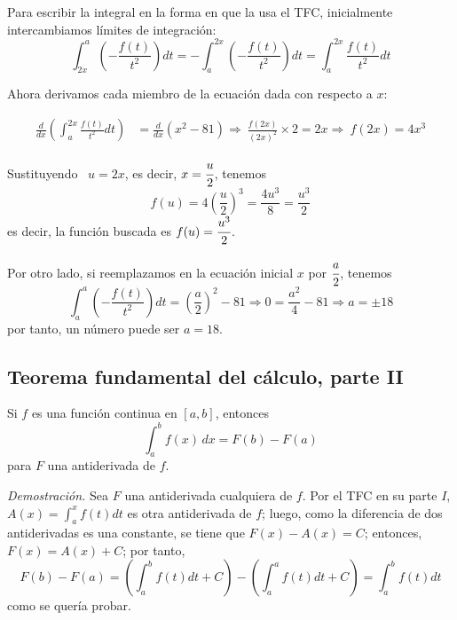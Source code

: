 Para escribir la integral en la forma en que la usa el TFC, inicialmente intercambiamos límites de integración:
{\small
\[
\int_{2x}^{a}\left(-\frac{f\left( t\right) }{t^{2}}\right)dt=-\int_{a}^{2x}\left(-\frac{f\left( t\right) }{t^{2}}\right)dt=\int_{a}^{2x}\frac{f\left( t\right) }{t^{2}}dt
\]
}

Ahora derivamos cada miembro de la ecuación dada con respecto a $x$:

{\small
\begin{align*}
\frac{d}{dx}\left( \int_{a}^{2x}\frac{f\left( t\right) }{t^{2}}dt\right) &=\frac{d}{dx}\left( x^{2}-81\right) \Rightarrow\ \frac{f\left( 2x\right)}{\left( 2x\right) ^{2}}\times 2=2x \Rightarrow\ f\left( 2x\right) =4x^{3}
\end{align*}
}

Sustituyendo \ $u=2x$, es decir, {\small $x=\cfrac{u}{2}$}, tenemos
{\small
\[
f\left(u\right)=4\left(\frac{u}{2}\right)^{3}=\frac{4u^{3}}{8}=\frac{u^{3}}{2}
\]
}
es decir, la función buscada es $f(u)=\cfrac{u^3}{2}$.

Por otro lado, si reemplazamos en la ecuación inicial $x$ por $\cfrac{a}{2}$, tenemos
\[
\int_{a}^{a}\left(-\frac{f\left( t\right) }{t^{2}}\right)dt=\left(\frac{a}{2}\right)^{2}-81\Rightarrow 0=\frac{a^2}{4}-81\Rightarrow a=\pm 18
\]
por tanto, un número puede ser $a=18$.

\subsection*{Teorema fundamental del cálculo, parte II}

\textnormal{Si \textit{$f$} es una función continua en \textit{$[a,b]$}, entonces
\[
\int_{a}^{b}f(x)\, dx=F(b)-F(a)
\]
para \textit{$F$} una antiderivada de \textit{$f$}.}

\textit{Demostración.} Sea $F$ una antiderivada cualquiera de $f$. Por el TFC en su parte $I$, {\footnotesize $A(x)=\displaystyle\int_{a}^{x}f(t)dt$} es otra antiderivada de $f$; luego, como la diferencia de dos antiderivadas es una constante, se tiene que {\footnotesize $F(x)-A(x)=C$}; entonces, {\footnotesize $F(x)=A\left( x\right) +C$}; por tanto,
{\small
\[
F(b)-F(a)=\left( \int_{a}^{b}f(t)dt+C\right) -\left(
\int_{a}^{a}f(t)dt+C\right) =\int_{a}^{b}f(t)dt
\]
}
como se quería probar.

